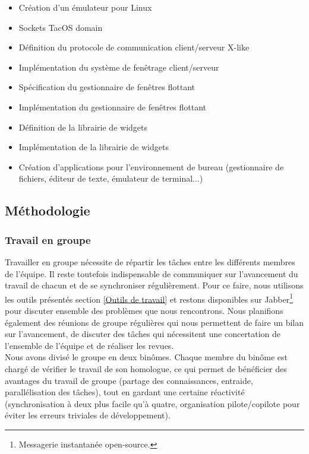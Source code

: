 \begin{itemize}
\renewcommand{\labelitemi}{$\bullet$}
\item {} Création d'un émulateur pour Linux
\item {} Sockets TacOS domain
\item {} Définition du protocole de communication client/serveur X-like
\item {} Implémentation du système de fenêtrage client/serveur
\item {} Spécification du gestionnaire de fenêtres flottant
\item {} Implémentation du gestionnaire de fenêtres flottant
\item {} Définition de la librairie de widgets
\item {} Implémentation de la librairie de widgets
\item {} Création d'applications pour l'environnement de bureau (gestionnaire de fichiers, éditeur de texte, émulateur de terminal...)
\end{itemize}

\subsection{Méthodologie}
\subsubsection{Travail en groupe}

Travailler en groupe nécessite de répartir les tâches entre les différents membres de l'équipe. Il reste toutefois indispensable de communiquer sur l'avancement du travail de chacun et de se synchroniser régulièrement. Pour ce faire, nous utilisons les outils présentés section \ref{Outils de travail} et restons disponibles sur Jabber\footnote{Messagerie instantanée open-source.} pour discuter ensemble des problèmes que nous rencontrons. Nous planifions également des réunions de groupe régulières qui nous permettent de faire un bilan sur l'avancement, de discuter des tâches qui nécessitent une concertation de l'ensemble de l'équipe et de réaliser les revues.\\

Nous avons divisé le groupe en deux binômes. Chaque membre du binôme est chargé de vérifier le travail de son homologue, ce qui permet de bénéficier des avantages du travail de groupe (partage des connaissances, entraide, parallélisation des tâches), tout en gardant une certaine réactivité (synchronisation à deux plus facile qu'à quatre, organisation pilote/copilote pour éviter les erreurs triviales de développement).


